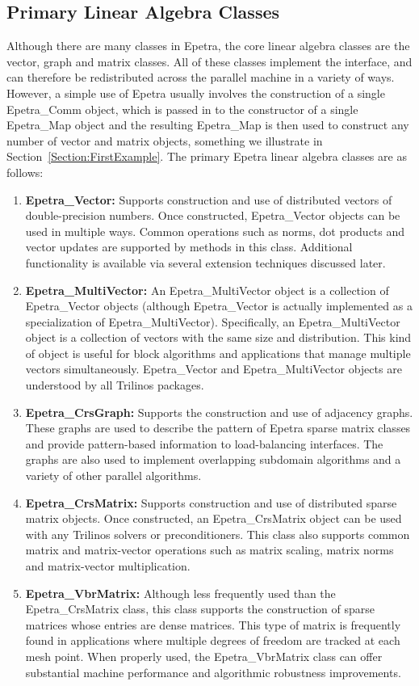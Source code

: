 \documentclass[12pt,relax]{EpetraUserGuide}
\newcommand{\comm}{Epetra\_Comm}
\newcommand{\map}{Epetra\_Map}
\renewcommand{\vector}{Epetra\_Vector}
\newcommand{\multivector}{Epetra\_MultiVector}
\newcommand{\crsgraph}{Epetra\_CrsGraph}
\newcommand{\crsmatrix}{Epetra\_CrsMatrix}
\newcommand{\vbrmatrix}{Epetra\_VbrMatrix}
\begin{document}
\subsection{Primary Linear Algebra Classes}
Although there are many classes in Epetra, the core linear algebra classes are the
vector, graph and matrix classes.  All of these classes implement the
\distobject{} interface, and can therefore be redistributed across the
parallel machine in a variety of ways.  However, a simple use of Epetra usually
involves the construction of a single \comm{} object, which is passed
in to the constructor of a single \map{} object and the resulting \map{}
is then used to construct any number of vector and matrix objects,
something we illustrate in Section~\ref{Section:FirstExample}.
The primary Epetra linear algebra classes are as follows:
\begin{enumerate}
\item {\bf \vector{}: } Supports construction and use of distributed
vectors of double-precision numbers.  Once constructed, \vector{}
objects can be used in multiple ways.  Common operations such as
norms, dot products and vector updates are supported by methods in
this class.  Additional functionality is available via several
extension techniques discussed later.
\item{\bf \multivector{}: } An \multivector{} object is a collection
of \vector{} objects (although \vector{} is actually implemented as a
specialization of \multivector{}).  Specifically, an \multivector{}
object is a collection of vectors with the same size and
distribution.  This kind of object is useful for block algorithms and
applications that manage multiple vectors simultaneously.  \vector{}
and \multivector{} objects are understood by all Trilinos packages.
\item{\bf \crsgraph{}:} Supports the construction and use of adjacency
graphs.  These graphs are used to describe the pattern of Epetra
sparse matrix classes and provide pattern-based information to
load-balancing interfaces.  The graphs are also used to implement
overlapping subdomain algorithms and a variety of other parallel
algorithms.
\item{\bf \crsmatrix{}:} Supports construction and use of distributed
sparse matrix objects.  Once constructed, an \crsmatrix{} object can
be used with any Trilinos solvers or preconditioners.  This class also
supports common matrix and matrix-vector operations such as matrix
scaling, matrix norms and matrix-vector multiplication.
\item{\bf \vbrmatrix{}:} Although less frequently used than the
\crsmatrix{} class, this class supports the construction of sparse
matrices whose entries are dense matrices.  This type of matrix is
frequently found in applications where multiple degrees of freedom are
tracked at each mesh point.  When properly used, the \vbrmatrix{}
class can offer substantial machine performance and algorithmic
robustness improvements.

\end{enumerate}
\end{document}
